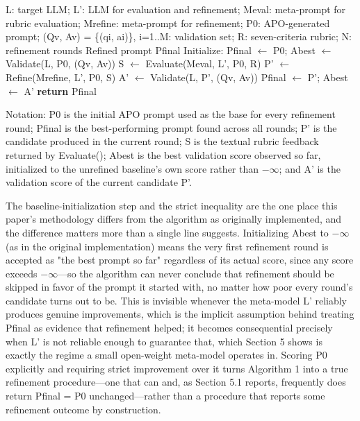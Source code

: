 \documentclass[a4paper,fleqn]{cas-sc}
\begin{document}
\begin{algorithm}[htbp]
\caption{MPIR Algorithm}
\begin{algorithmic}[1]
\Require L: target LLM; L': LLM for evaluation and refinement; Meval: meta-prompt for rubric evaluation; Mrefine: meta-prompt for refinement; P0: APO-generated prompt; (Qv, Av) = \{(qi, ai)\}, i=1..M: validation set; R: seven-criteria rubric; N: refinement rounds
\Ensure Refined prompt Pfinal
\State Initialize: Pfinal $\leftarrow$ P0; Abest $\leftarrow$ Validate(L, P0, (Qv, Av)) 
\State S $\leftarrow$ Evaluate(Meval, L', P0, R) 
\State P' $\leftarrow$ Refine(Mrefine, L', P0, S) 
\State A' $\leftarrow$ Validate(L, P', (Qv, Av)) 
\State Pfinal $\leftarrow$ P'; Abest $\leftarrow$ A'
\EndIf
\EndFor
\State \textbf{return} Pfinal
\end{algorithmic}
\end{algorithm}

Notation: P0 is the initial APO prompt used as the base for every refinement round; Pfinal is the best-performing prompt found across all rounds; P' is the candidate produced in the current round; S is the textual rubric feedback returned by Evaluate(); Abest is the best validation score observed so far, initialized to the unrefined baseline's own score rather than $-$$\infty$; and A' is the validation score of the current candidate P'.

The baseline-initialization step and the strict inequality are the one place this paper's methodology differs from the algorithm as originally implemented, and the difference matters more than a single line suggests. Initializing Abest to $-$$\infty$ (as in the original implementation) means the very first refinement round is accepted as "the best prompt so far" regardless of its actual score, since any score exceeds $-$$\infty$---so the algorithm can never conclude that refinement should be skipped in favor of the prompt it started with, no matter how poor every round's candidate turns out to be. This is invisible whenever the meta-model L' reliably produces genuine improvements, which is the implicit assumption behind treating Pfinal as evidence that refinement helped; it becomes consequential precisely when L' is not reliable enough to guarantee that, which Section 5 shows is exactly the regime a small open-weight meta-model operates in. Scoring P0 explicitly and requiring strict improvement over it turns Algorithm 1 into a true refinement procedure---one that can and, as Section 5.1 reports, frequently does return Pfinal = P0 unchanged---rather than a procedure that reports some refinement outcome by construction.
\end{document}
